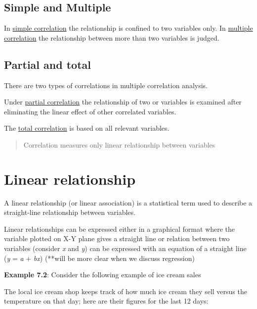 \documentclass[
]{book}
\begin{document}
\hypertarget{simple-and-multiple}{%
\subsection{Simple and Multiple}\label{simple-and-multiple}}

In \underline{simple correlation} the relationship
is confined to two variables only. In \underline{multiple correlation} the
relationship between more than two variables is judged.

\hypertarget{partial-and-total}{%
\subsection{Partial and total}\label{partial-and-total}}

There are two types of correlations in multiple
correlation analysis.

Under \underline{partial correlation} the relationship of two or variables is
examined after eliminating the linear effect of other correlated
variables.

The \underline{total correlation} is based on all relevant variables.

\begin{quote}
Correlation measures only linear relationship between variables
\end{quote}

\hypertarget{linear-relationship}{%
\section{Linear relationship}\label{linear-relationship}}

A linear relationship (or linear association)
is a statistical term used to describe a straight-line relationship
between variables.

Linear relationships can be expressed either in a graphical format where
the variable plotted on X-Y plane gives a straight line or relation
between two variables (consider \emph{x} and \emph{y}) can be expressed with an
equation of a straight line (\emph{y} = \emph{a} + \emph{bx}) (**will be more clear
when we discuss regression)

\textbf{Example 7.2}: Consider the following example of ice cream sales

The local ice cream shop keeps track of how much ice cream they sell
versus the temperature on that day; here are their figures for the last
12 days:
\end{document}

